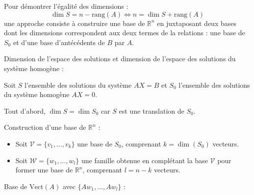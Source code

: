 \documentclass[10pt,a4paper]{article}
\begin{document}
Pour démontrer l'égalité des dimensions :
$$\dim S = n - \text{rang}(A) \iff n = \dim S + \text{rang}(A)$$ une approche consiste à construire
une base de $\mathbb{R}^n$ en juxtaposant deux bases dont les dimensions correspondent aux deux
termes de la relations : une base de $S_0$ et d'une base d'antécédents de $B$ par $A$.

\q Dimension de l'espace des solutions et dimension de l'espace des solutions du système homogène :

Soit \( S \) l'ensemble des solutions du système \( AX = B \) et \( S_0 \) l'ensemble des solutions
du système homogène \( AX = 0 \).

Tout d'abord, $\dim S = \dim S_0 $ car $S$ est une translation de $S_0$.

\q Construction d'une base de $\mathbb{R}^n$ :

\begin{itemize}
    \item Soit $\mathcal{V} = \{v_1, \ldots, v_k\}$ une base de $S_0$, comprenant $k = \dim(S_0)$
    vecteurs.
    \item Soit $\mathcal{W} = \{w_1, \ldots, w_l\}$ une famille obtenue en complétant la base
    $\mathcal{V}$ pour former une base de $\mathbb{R}^n$, comprenant $l = n - k$ vecteurs.
\end{itemize}

\q Base de $\text{Vect}(A)$ avec $\{Aw_1, \ldots, Aw_l\}$ :
\end{document}
